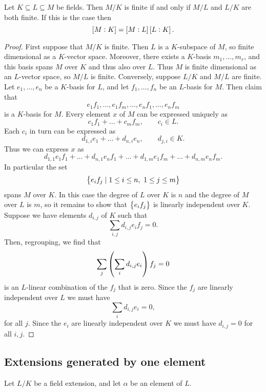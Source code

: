 \begin{proposition}
Let $ K \subseteq L \subseteq M $ be fields. Then $ M / K $ is finite if and only if $ M / L $ and $ L / K $ are both finite. If this is the case then
$$ \sbr{M : K} = \sbr{M : L}\sbr{L : K}. $$
\end{proposition}

\begin{proof}
First suppose that $ M / K $ is finite. Then $ L $ is a $ K $-subspace of $ M $, so finite dimensional as a $ K $-vector space. Moreover, there exists a $ K $-basis $ m_1, \dots, m_r $, and this basis spans $ M $ over $ K $ and thus also over $ L $. Thus $ M $ is finite dimensional as an $ L $-vector space, so $ M / L $ is finite. Conversely, suppose $ L / K $ and $ M / L $ are finite. Let $ e_1, \dots, e_n $ be a $ K $-basis for $ L $, and let $ f_1, \dots, f_n $ be an $ L $-basis for $ M $. Then claim that
$$ e_1f_1, \dots, e_1f_m, \dots, e_nf_1, \dots, e_nf_m $$
is a $ K $-basis for $ M $. Every element $ x $ of $ M $ can be expressed uniquely as
$$ c_1f_1 + \dots + c_mf_m, \qquad c_i \in L. $$
Each $ c_i $ in turn can be expressed as
$$ d_{1, i}e_1 + \dots + d_{n, i}e_n, \qquad d_{j, i} \in K. $$
Thus we can express $ x $ as
$$ d_{1, 1}e_1f_1 + \dots + d_{n, 1}e_nf_1 + \dots + d_{1, m}e_1f_m + \dots + d_{n, m}e_nf_m. $$
In particular the set
$$ \cbr{e_if_j \mid 1 \le i \le n, \ 1 \le j \le m} $$
spans $ M $ over $ K $. In this case the degree of $ L $ over $ K $ is $ n $ and the degree of $ M $ over $ L $ is $ m $, so it remains to show that $ \cbr{e_if_j} $ is linearly independent over $ K $. Suppose we have elements $ d_{i, j} $ of $ K $ such that
$$ \sum_{i, j} d_{i, j}e_if_j = 0. $$
Then, regrouping, we find that
$$ \sum_j \br{\sum_i d_{i, j}e_i}f_j = 0 $$
is an $ L $-linear combination of the $ f_j $ that is zero. Since the $ f_j $ are linearly independent over $ L $ we must have
$$ \sum_i d_{i, j}e_i = 0, $$
for all $ j $. Since the $ e_i $ are linearly independent over $ K $ we must have $ d_{i, j} = 0 $ for all $ i, j $.
\end{proof}


\subsection{Extensions generated by one element}

Let $ L / K $ be a field extension, and let $ \alpha $ be an element of $ L $.

